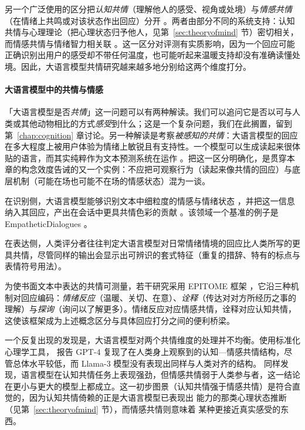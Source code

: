 另一个广泛使用的区分把\emph{认知共情}（理解他人的感受、视角或处境）与\emph{情感共情}（在情绪上共鸣或对该状态作出回应）分开 \citep{dvash2014theory}。两者由部分不同的系统支持：认知共情与心理理论（把心理状态归予他人，见第~\ref{sec:theoryofmind} 节）密切相关，而情感共情与情绪智力相关联 \citep{dvash2014theory, preckel2018interaction}。这一区分对评测有实质影响，因为一个回应可能正确识别出用户的感受却不带任何温度，也可能听起来温暖支持却没有准确读懂处境。因此，大语言模型共情研究越来越多地分别给这两个维度打分。

\paragraph{大语言模型中的共情与情感} 
「大语言模型是否{\em 共情}」这一问题可以有两种解读。我们可以追问它是否以可与人类或其他动物相比的方式{\em 感受}到什么；这是一个复杂问题，我们在此搁置，留到第~\ref{chap:cognition} 章讨论。另一种解读是考察\emph{被感知的共情}：大语言模型的回应在多大程度上被用户体验为情绪上敏锐且有支持性。一个模型可以生成读起来很体贴的语言，而其实纯粹作为文本预测系统在运作 \citep{sorin2024large}。把这一区分明确化，是贯穿本章的构念效度告诫的又一个实例：不应把可观察行为（读起来像共情的回应）与底层机制（可能在场也可能不在场的情感状态）混为一谈。

在识别侧，大语言模型能够识别文本中细粒度的情感与情绪状态 \citep{broekens2023fine}，并把这一信息纳入其回应，产出在会话中更具共情色彩的贡献 \citep{yang2024enhancing, yan2024talkhumanlikeagentsempathetic}。该领域一个基准的例子是 EmpatheticDialogues \citep{rashkin2019towards}。

在表达侧，人类评分者往往判定大语言模型对日常情绪情境的回应比人类所写的更具共情，尽管同样的输出会显示出可辨识的套式特征（重复的措辞、特有的标点与表情符号用法）\citep{lee2024large}。

为使书面文本中表达的共情可测量，若干研究采用 EPITOME 框架 \citep{sharma2020computational}，它沿三种机制对回应编码：\emph{情绪反应}（温暖、关切、在意）、\emph{诠释}（传达对对方所经历之事的理解）与\emph{探询}（询问以了解更多）。情绪反应对应情感共情，诠释对应认知共情，这使该框架成为上述概念区分与具体回应打分之间的便利桥梁。

一个反复出现的发现是，大语言模型对两个共情维度的处理并不均衡。使用标准化心理学工具，\citet{yu2025can} 报告 GPT-4 复现了在人类身上观察到的认知—情感共情结构，尽管总体水平较低，而 Llama-3 模型没有表现出同样与人类对齐的结构。\citet{williams2025heartificial} 同样发现，语言模型在认知共情任务上表现强劲，但情感共情弱于人类参与者，这一结论在更小与更大的模型上都成立。这一初步图景（认知共情强于情感共情）是符合直觉的，因为认知共情倚赖的正是大语言模型已表现出%
能力的那类心理状态推断（见第~\ref{sec:theoryofmind} 节），而情感共情则意味着%
某种更接近真实感受的东西。

